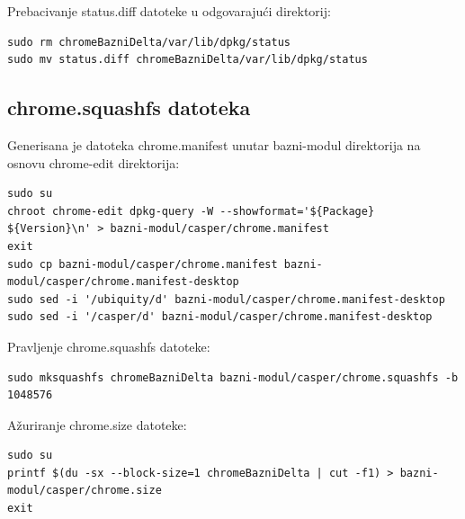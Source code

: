 \documentclass[12pt,vi]{mitthesis}
\begin{document}
\noindent
Prebacivanje status.diff datoteke u odgovarajući direktorij:
\begin{lstlisting}[style=BashInputStyle]
sudo rm chromeBazniDelta/var/lib/dpkg/status
sudo mv status.diff chromeBazniDelta/var/lib/dpkg/status
\end{lstlisting}

\subsection*{chrome.squashfs datoteka}
\noindent
Generisana je datoteka chrome.manifest unutar bazni-modul direktorija na osnovu chrome-edit direktorija:
\begin{lstlisting}[style=BashInputStyle]
sudo su
chroot chrome-edit dpkg-query -W --showformat='${Package} ${Version}\n' > bazni-modul/casper/chrome.manifest
exit
sudo cp bazni-modul/casper/chrome.manifest bazni-modul/casper/chrome.manifest-desktop
sudo sed -i '/ubiquity/d' bazni-modul/casper/chrome.manifest-desktop
sudo sed -i '/casper/d' bazni-modul/casper/chrome.manifest-desktop
\end{lstlisting}
\noindent
Pravljenje chrome.squashfs datoteke:
\begin{lstlisting}[style=BashInputStyle]
sudo mksquashfs chromeBazniDelta bazni-modul/casper/chrome.squashfs -b 1048576
\end{lstlisting}
\noindent
Ažuriranje chrome.size datoteke:
\begin{lstlisting}[style=BashInputStyle]
sudo su
printf $(du -sx --block-size=1 chromeBazniDelta | cut -f1) > bazni-modul/casper/chrome.size
exit
\end{lstlisting}
\end{document}
